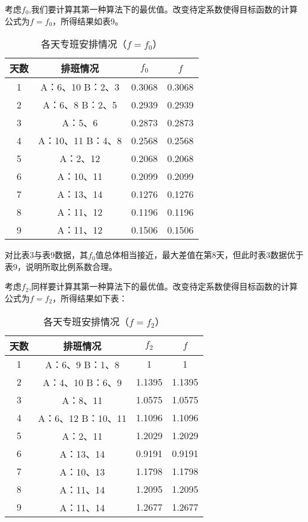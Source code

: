 \documentclass{article}
\begin{document}
	考虑$f_0$,我们要计算其第一种算法下的最优值。改变待定系数使得目标函数的计算公式为$f=f_0$，所得结果如表9。

	\begin{table}[!h]
		\centering
		\caption{各天专班安排情况（$f=f_0$）}
		\begin{tabular}{|c|c|c|c|}
			\hline
			天数 & 排班情况          & $f_0$  & $f$    \\
			\hline
			1  & A：6、10 B：2、3  & 0.3068 & 0.3068 \\
			2  & A：6、8 B：2、5   & 0.2939 & 0.2939 \\
			3  & A：5、6         & 0.2873 & 0.2873 \\
			4  & A：10、11 B：4、8 & 0.2568 & 0.2568 \\
			5  & A：2、12        & 0.2068 & 0.2068 \\
			6  & A：10、11       & 0.2099 & 0.2099 \\
			7  & A：13、14       & 0.1276 & 0.1276 \\
			8  & A：11、12       & 0.1196 & 0.1196 \\
			9  & A：11、12       & 0.1506 & 0.1506 \\
			\hline
		\end{tabular}
	\end{table}

    对比表3与表9数据，其$f_0$值总体相当接近，最大差值在第8天，但此时表3数据优于表9，说明所取比例系数合理。

	考虑$f_2$,同样要计算其第一种算法下的最优值。改变待定系数使得目标函数的计算公式为$f=f_2$，所得结果如下表：
	\begin{table}[!h]
		\centering
		\caption{各天专班安排情况（$f=f_2$）}
		\begin{tabular}{|c|c|c|c|}
			\hline
			天数 & 排班情况           & $f_2$  & $f$    \\
			\hline
			1  & A：6、9 B：1、8    & 1      & 1      \\
			2  & A：4、10 B：6、9   & 1.1395 & 1.1395 \\
			3  & A：8、11         & 1.0575 & 1.0575 \\
			4  & A：6、12 B：10、11 & 1.1096 & 1.1096 \\
			5  & A：2、11         & 1.2029 & 1.2029 \\
			6  & A：13、14        & 0.9191 & 0.9191 \\
			7  & A：10、13        & 1.1798 & 1.1798 \\
			8  & A：11、14        & 1.2095 & 1.2095 \\
			9  & A：11、14        & 1.2677 & 1.2677 \\
			\hline
		\end{tabular}
	\end{table}
\end{document}
